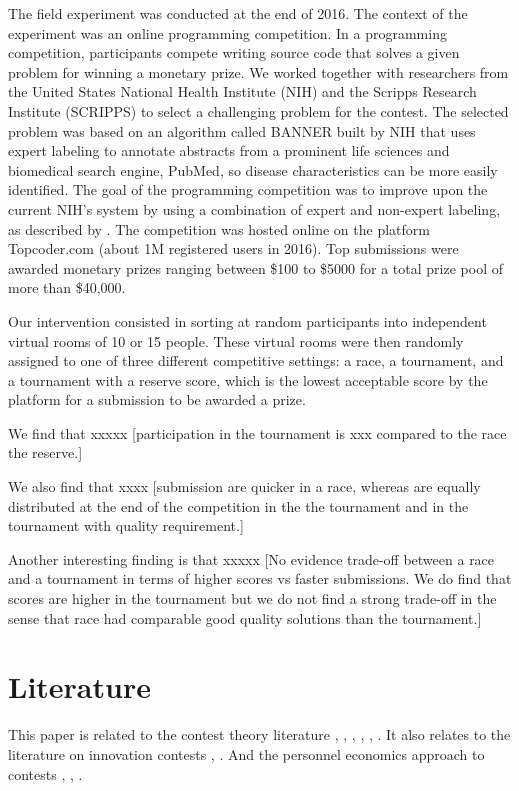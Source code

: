 \documentclass[12pt,]{article}
\theoremstyle{plain} %
\begin{document}
The field experiment was conducted at the end of 2016. The context of
the experiment was an online programming competition. In a programming
competition, participants compete writing source code that solves a
given problem for winning a monetary prize. We worked together with
researchers from the United States National Health Institute (NIH) and
the Scripps Research Institute (SCRIPPS) to select a challenging problem
for the contest. The selected problem was based on an algorithm called
BANNER built by NIH \citep{leaman2008banner} that uses expert labeling
to annotate abstracts from a prominent life sciences and biomedical
search engine, PubMed, so disease characteristics can be more easily
identified. The goal of the programming competition was to improve upon
the current NIH's system by using a combination of expert and non-expert
labeling, as described by \citet{good2014microtask}. The competition was
hosted online on the platform Topcoder.com (about 1M registered users in
2016). Top submissions were awarded monetary prizes ranging between
\$100 to \$5000 for a total prize pool of more than \$40,000.

Our intervention consisted in sorting at random participants into
independent virtual rooms of 10 or 15 people. These virtual rooms were
then randomly assigned to one of three different competitive settings: a
race, a tournament, and a tournament with a reserve score, which is the
lowest acceptable score by the platform for a submission to be awarded a
prize.

We find that xxxxx {[}participation in the tournament is xxx compared to
the race the reserve.{]}

We also find that xxxx {[}submission are quicker in a race, whereas are
equally distributed at the end of the competition in the the tournament
and in the tournament with quality requirement.{]}

Another interesting finding is that xxxxx {[}No evidence trade-off
between a race and a tournament in terms of higher scores vs faster
submissions. We do find that scores are higher in the tournament but we
do not find a strong trade-off in the sense that race had comparable
good quality solutions than the tournament.{]}

\section{Literature}\label{literature}

This paper is related to the contest theory literature
\citet{dixit1987strategic} \citet{baye2003strategic},
\citet{parreiras2010contests}, \citet{moldovanu2001optimal},
\citet{moldovanu2006contest}, \citet{siegel2009all},
\citet{siegel2014contests}. It also relates to the literature on
innovation contests \citet{taylor1995digging}, \citet{che2003optimal}.
And the personnel economics approach to contests \citet{lazear1981rank},
\citet{green1983comparison}, \citet{mary1984economic}.
\end{document}
